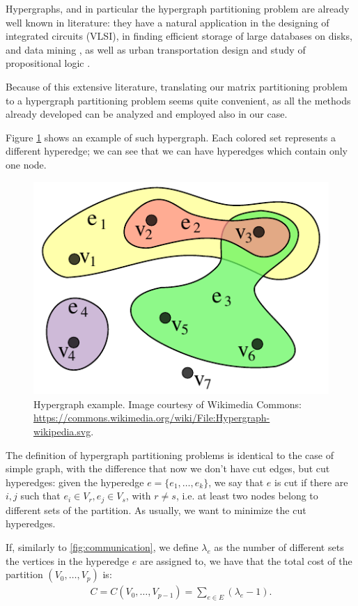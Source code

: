 Hypergraphs, and in particular the hypergraph partitioning problem are already well known in literature: they have a natural application in the designing of integrated circuits (VLSI), in finding efficient storage of large databases on disks, and data mining \cite{vlsi}, as well as urban transportation design and study of propositional logic \cite{papa_hypergraph}.

Because of this extensive literature, translating our matrix partitioning problem to a hypergraph partitioning problem seems quite convenient, as all the methods already developed can be analyzed and employed also in our case.

Figure \ref{fig:hypergraph} shows an example of such hypergraph. Each colored set represents a different hyperedge; we can see that we can have hyperedges which contain only one node.

\begin{figure}[h]
	\centering
	\includegraphics{img/hypergraph}
	\caption{Hypergraph example. Image courtesy of Wikimedia Commons: \url{https://commons.wikimedia.org/wiki/File:Hypergraph-wikipedia.svg}.}
	\label{fig:hypergraph}
\end{figure}

The definition of hypergraph partitioning problems is identical to the case of simple graph, with the difference that now we don't have cut edges, but cut hyperedges: given the hyperedge $e=\{e_1,\dots,e_k\}$, we say that $e$ is cut if there are $i,j$ such that $e_i \in V_r, e_j \in V_s$, with $r \neq s$, i.e. at least two nodes belong to different sets of the partition. As usually, we want to minimize the cut hyperedges.

If, similarly to \eqref{fig:communication}, we define $\lambda_e$ as the number of different sets the vertices in the hyperedge $e$ are assigned to, we have that the total cost of the partition $(V_0,\dots,V_p)$ is:
\begin{align}
	C = C(V_0,\dots,V_{p-1}) = \sum_{e \in E} (\lambda_e -1).
	\label{eq:cost_hypergraph}
\end{align}

